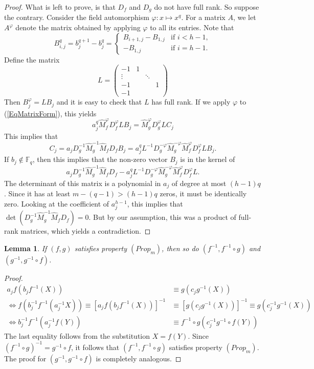 \documentclass[a4paper]{article}
\newtheorem{lm}[thm]{Lemma}
\theoremstyle{definition}
\renewcommand{\phi}{\varphi}
\newcommand{\FF}{\mathbb F}
\begin{document}
\begin{proof}
What is left to prove, is that $D_f$ and $D_g$ do not have full rank.
So suppose the contrary.
Consider the field automorphism $\phi: x \mapsto x^q$.
For a matrix $A$, we let $A^\phi$ denote the matrix obtained by applying $\phi$ to all its entries.
Note that 
\[
 B_{i,j}^q = b_j^{q+1} - b_j^q = \begin{cases}
  B_{i+1, j} - B_{1,j} & \text{if } i < h-1, \\
  - B_{1,j} & \text{if } i = h-1.
 \end{cases}
\]
Define the matrix
\[
 L = \begin{pmatrix}
 -1 & 1 \\
 \vdots & & \ddots \\
 -1 & & & 1 \\
 -1
 \end{pmatrix}
\]
Then $B_j^\varphi = L B_j$ and it is easy to check that $L$ has full rank.
If we apply $\phi$ to (\ref{EqMatrixForm}), this yields
\[
 a_j^q \hat M_f^\phi D_f^\phi L B_j = \hat M_g^\phi D_g^\phi L C_j
\]
This implies that
\[
 C_j = a_j D_g^{-1} \hat M_g^{-1} \hat M_f D_f B_j = a_j^q L^{-1} D_g^{-\phi} \hat M_g^{-\phi} \hat M_f^{\phi} D_f^{\phi} L B_j.
\]
If $b_j \notin \FF_q$, then this implies that the non-zero vector $B_j$ is in the kernel of
\[
 a_j D_g^{-1} \hat M_g^{-1} \hat M_f D_f - a_j^q L^{-1} D_g^{-\phi} \hat M_g^{-\phi} \hat M_f^{\phi} D_f^{\phi} L.
\]
The determinant of this matrix is a polynomial in $a_j$ of degree at most $(h-1)q$.
Since it has at least $m - (q-1) > (h-1)q$ zeros, it must be identically zero.
Looking at the coefficient of $a_j^{h-1}$, this implies that $\det(D_g^{-1} \hat M_g^{-1} \hat M_f D_f) = 0$.
But by our assumption, this was a product of full-rank matrices, which yields a contradiction.
\end{proof}

\begin{lm}
 \label{LmInverse}
 If $(f,g)$ satisfies property $(Prop_m)$, then so do $(f^{-1},f^{-1} \circ g)$ and $(g^{-1}, g^{-1} \circ f)$.
\end{lm}

\begin{proof}
 \begin{align*}
  a_j f ( b_j f^{-1} (X)) &\equiv g (c_j g^{-1} (X)) \\
 \iff  f (b_j^{-1} f^{-1} (a_j^{-1} X)) \equiv [ a_j f ( b_j f^{-1} (X))]^{-1} &\equiv 
 [g (c_j g^{-1} (X))]^{-1} \equiv g( c_j^{-1} g^{-1} (X)) \\
\iff b_j^{-1}  f^{-1} (a_j^{-1} f(Y)) &\equiv f^{-1} \circ g (c_j^{-1} g^{-1} \circ f(Y))
 \end{align*}
The last equality follows from the substitution $X = f(Y)$.
Since $(f^{-1} \circ g)^{-1} = g^{-1} \circ f$, it follows that $(f^{-1}, f^{-1} \circ g)$ satisfies property $(Prop_m)$.
The proof for $(g^{-1}, g^{-1} \circ f)$ is completely analogous.
\end{proof}
\end{document}
